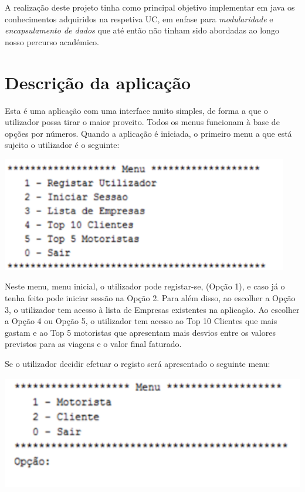 \documentclass[12pt,a4paper]{report}
\begin{document}
A realização deste projeto tinha como principal objetivo implementar em java os conhecimentos adquiridos na respetiva UC, em enfase para \emph{modularidade} e \emph{encapsulamento de dados} que até então não tinham sido abordadas ao longo nosso percurso académico.

\chapter{Descrição da aplicação}

Esta é uma aplicação com uma interface muito simples, de forma a que o utilizador possa tirar o maior proveito. Todos os menus funcionam à base de opções por números. 
Quando a aplicação é iniciada, o primeiro menu a que está sujeito o utilizador é o seguinte:


\includegraphics[width=0.7\linewidth, height=5cm]{1.png}

Neste menu, menu inicial, o utilizador pode registar-se, (Opção 1), e caso já o tenha feito pode iniciar sessão na Opção 2. Para além disso, ao escolher a Opção 3, o utilizador tem acesso à lista de Empresas existentes na aplicação. Ao escolher a Opção 4 ou Opção 5, o utilizador tem acesso ao Top 10 Clientes que mais gastam e ao Top 5 motoristas que apresentam mais desvios entre os valores previstos para as viagens e o valor final faturado. 


Se o utilizador decidir efetuar o registo será apresentado o seguinte menu:

\includegraphics[width=0.7\linewidth, height=5cm]{2.png}
\end{document}
